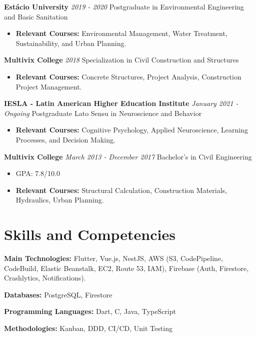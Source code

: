 \documentclass[10pt, letterpaper]{article}
\begin{document}
\textbf{Estácio University} \hfill \textit{2019 - 2020}\newline
Postgraduate in Environmental Engineering and Basic Sanitation
\begin{itemize}
    \item \textbf{Relevant Courses:} Environmental Management, Water Treatment, Sustainability, and Urban Planning.
\end{itemize}

\textbf{Multivix College} \hfill \textit{2018}\newline
Specialization in Civil Construction and Structures
\begin{itemize}
    \item \textbf{Relevant Courses:} Concrete Structures, Project Analysis, Construction Project Management.
\end{itemize}

\textbf{IESLA - Latin American Higher Education Institute} \hfill \textit{January 2021 - Ongoing}\newline
Postgraduate Lato Sensu in Neuroscience and Behavior
\begin{itemize}
    \item \textbf{Relevant Courses:} Cognitive Psychology, Applied Neuroscience, Learning Processes, and Decision Making.
\end{itemize}

\textbf{Multivix College} \hfill \textit{March 2013 - December 2017}\newline
Bachelor's in Civil Engineering
\begin{itemize}
    \item GPA: 7.8/10.0
    \item \textbf{Relevant Courses:} Structural Calculation, Construction Materials, Hydraulics, Urban Planning.
\end{itemize}
    
\section{Skills and Competencies}
\textbf{Main Technologies:} Flutter, Vue.js, NestJS, AWS (S3, CodePipeline, CodeBuild, Elastic Beanstalk, EC2, Route 53, IAM), Firebase (Auth, Firestore, Crashlytics, Notifications).

\textbf{Databases:} PostgreSQL, Firestore

\textbf{Programming Languages:} Dart, C, Java, TypeScript

\textbf{Methodologies:} Kanban, DDD, CI/CD, Unit Testing
\end{document}
